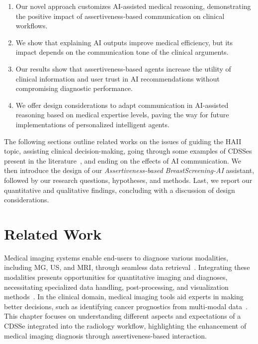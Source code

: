 \vspace{0.05mm}

\begin{enumerate}
\item Our novel approach customizes \ac{AI}-assisted medical reasoning, demonstrating the positive impact of assertiveness-based communication on clinical workflows.
\item We show that explaining \ac{AI} outputs improve medical efficiency, but its impact depends on the communication tone of the clinical arguments.
\item Our results show that assertiveness-based agents increase the utility of clinical information and user trust in \ac{AI} recommendations without compromising diagnostic performance.
\item We offer design considerations to adapt communication in \ac{AI}-assisted reasoning based on medical expertise levels, paving the way for future implementations of personalized intelligent agents.
\end{enumerate}

\vspace{0.50mm}

The following sections outline related works on the issues of guiding the \ac{HAII} topic, assisting clinical decision-making, going through some examples of \acp{CDSSe} present in the literature~\cite{NAISEH2023102941, 10.1145/3531146.3533193}, and ending on the effects of \ac{AI} communication.
We then introduce the design of our {\it Assertiveness-based BreastScreening-AI} assistant, followed by our research questions, hypotheses, and methods.
Last, we report our quantitative and qualitative findings, concluding with a discussion of design considerations.

\section{Related Work}
\label{sec:chap006002}

Medical imaging systems enable end-users to diagnose various modalities, including \ac{MG}, \ac{US}, and \ac{MRI}, through seamless data retrieval~\cite{faraji2019radiologic}.
Integrating these modalities presents opportunities for quantitative imaging and diagnoses, necessitating specialized data handling, post-processing, and visualization methods~\cite{Igarashi:2016:IVS:2984511.2984537}.
In the clinical domain, medical imaging tools aid experts in making better decisions, such as identifying cancer prognostics from multi-modal data~\cite{IBRAHIM2019438, Tan2023}.
This chapter focuses on understanding different aspects and expectations of a \ac{CDSSe} integrated into the radiology workflow, highlighting the enhancement of medical imaging diagnosis through assertiveness-based interaction.

